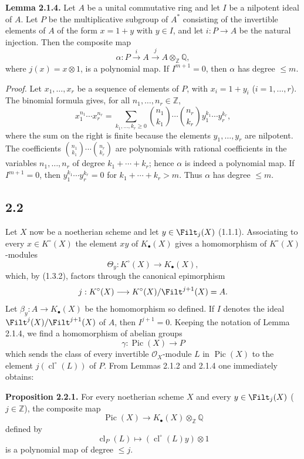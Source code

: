 \documentclass[11pt]{article}
\newcommand{\cl}{\operatorname{cl}}
\providecommand{\Pic}{\operatorname{Pic}}
\begin{document}
\textbf{Lemma 2.1.4.} Let $A$ be a unital commutative ring and let $I$ be a nilpotent ideal of $A$. Let $P$ be the multiplicative subgroup of $A^*$ consisting of the invertible elements of $A$ of the form $x=1+y$ with $y\in I$, and let $i:P\to A$ be the natural injection. Then the composite map
\[
\alpha:P\xrightarrow{i}A\xrightarrow{j}A\otimes_{\mathbb Z}\mathbb Q,
\]
where $j(x)=x\otimes1$, is a polynomial map. If $I^{m+1}=0$, then $\alpha$ has degree $\leq m$.

\emph{Proof.} Let $x_1,\ldots,x_r$ be a sequence of elements of $P$, with $x_i=1+y_i$ ($i=1,\ldots,r$). The binomial formula gives, for all $n_1,\ldots,n_r\in\mathbb Z$,
\begin{equation}\tag{2.1.5}
 x_1^{n_1}\cdots x_r^{n_r}
 =\sum_{k_1,\ldots,k_r\geq0}\binom{n_1}{k_1}\cdots\binom{n_r}{k_r}
 y_1^{k_1}\cdots y_r^{k_r},
\end{equation}
where the sum on the right is finite because the elements $y_1,\ldots,y_r$ are nilpotent. The coefficients $\binom{n_1}{k_1}\cdots\binom{n_r}{k_r}$ are polynomials with rational coefficients in the variables $n_1,\ldots,n_r$ of degree $k_1+\cdots+k_r$; hence $\alpha$ is indeed a polynomial map. If $I^{m+1}=0$, then $y_1^{k_1}\cdots y_r^{k_r}=0$ for $k_1+\cdots+k_r>m$. Thus $\alpha$ has degree $\leq m$.

\subsection*{2.2}
Let $X$ now be a noetherian scheme and let $y\in\Filt_j(X)$ (1.1.1). Associating to every $x\in K^\circ(X)$ the element $xy$ of $K_\bullet(X)$ gives a homomorphism of $K^\circ(X)$-modules
\[
 \Theta_y:K^\circ(X)\longrightarrow K_\bullet(X),
\]
which, by (1.3.2), factors through the canonical epimorphism
\[
 j:K^\circ(X)\longrightarrow K^\circ(X)/\Filt^{j+1}(X)=A.
\]
Let $\beta_y:A\to K_\bullet(X)$ be the homomorphism so defined. If $I$ denotes the ideal $\Filt^j(X)/\Filt^{j+1}(X)$ of $A$, then $I^{j+1}=0$. Keeping the notation of Lemma 2.1.4, we find a homomorphism of abelian groups
\[
 \gamma:\Pic(X)\longrightarrow P
\]
which sends the class of every invertible $\mathcal O_X$-module $L$ in $\Pic(X)$ to the element $j(\cl^\circ(L))$ of $P$. From Lemmas 2.1.2 and 2.1.4 one immediately obtains:

\textbf{Proposition 2.2.1.} For every noetherian scheme $X$ and every $y\in\Filt_j(X)$ ($j\in\mathbb Z$), the composite map
\[
 \Pic(X)\longrightarrow K_\bullet(X)\otimes_{\mathbb Z}\mathbb Q
\]
defined by
\[
 \cl_P(L)\longmapsto (\cl^\circ(L)y)\otimes1
\]
is a polynomial map of degree $\leq j$.
\end{document}
